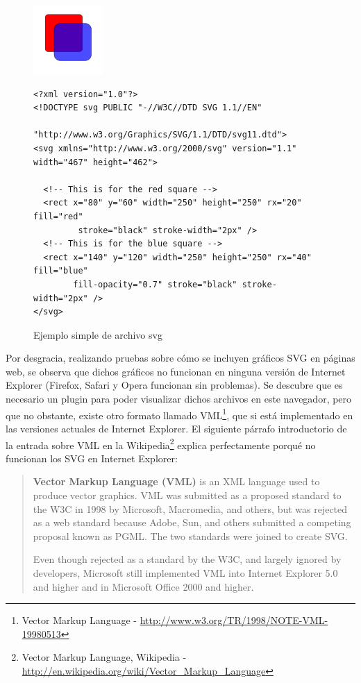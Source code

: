\begin{figure}[ht]
\centering
\includegraphics{svg_example.png}
\begin{verbatim}
<?xml version="1.0"?>
<!DOCTYPE svg PUBLIC "-//W3C//DTD SVG 1.1//EN"
                     "http://www.w3.org/Graphics/SVG/1.1/DTD/svg11.dtd">
<svg xmlns="http://www.w3.org/2000/svg" version="1.1" width="467" height="462">
 
  <!-- This is for the red square -->
  <rect x="80" y="60" width="250" height="250" rx="20" fill="red"
         stroke="black" stroke-width="2px" />
  <!-- This is for the blue square -->
  <rect x="140" y="120" width="250" height="250" rx="40" fill="blue"
        fill-opacity="0.7" stroke="black" stroke-width="2px" />
</svg>
\end{verbatim}
\caption{Ejemplo simple de archivo svg}\label{fig:svg_example}
\end{figure}

Por desgracia, realizando pruebas sobre cómo se incluyen gráficos SVG en páginas web, se observa que dichos gráficos no funcionan en ninguna versión de Internet Explorer (Firefox, Safari y Opera funcionan sin problemas). Se descubre que es necesario un plugin para poder visualizar dichos archivos en este navegador, pero que no obstante, existe otro formato llamado VML\footnote{Vector Markup Language - \url{http://www.w3.org/TR/1998/NOTE-VML-19980513}}, que si está implementado en las versiones actuales de Internet Explorer. El siguiente párrafo introductorio de la entrada sobre VML en la Wikipedia\footnote{Vector Markup Language, Wikipedia - \url{http://en.wikipedia.org/wiki/Vector_Markup_Language}} explica perfectamente porqué no funcionan los SVG en Internet Explorer:

\begin{quote}
	\textbf{Vector Markup Language (VML)} is an XML language used to produce vector graphics. VML was submitted as a proposed standard to the W3C in 1998 by Microsoft, Macromedia, and others, but was rejected as a web standard because Adobe, Sun, and others submitted a competing proposal known as PGML. The two standards were joined to create SVG.

Even though rejected as a standard by the W3C, and largely ignored by developers, Microsoft still implemented VML into Internet Explorer 5.0 and higher and in Microsoft Office 2000 and higher.
\end{quote}

